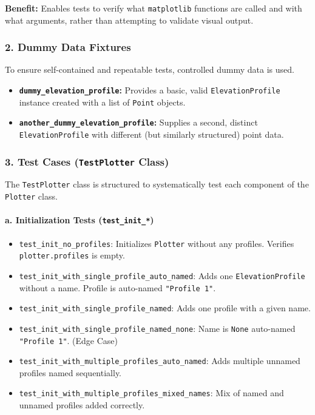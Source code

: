 \documentclass[12pt]{article}
\begin{document}
\textbf{Benefit:} Enables tests to verify what \texttt{matplotlib} functions are called and with what arguments, rather than attempting to validate visual output.

\subsubsection*{2. Dummy Data Fixtures}
To ensure self-contained and repeatable tests, controlled dummy data is used.

\begin{itemize}
  \item \textbf{\texttt{dummy\_elevation\_profile}:} Provides a basic, valid \texttt{ElevationProfile} instance created with a list of \texttt{Point} objects.
  \item \textbf{\texttt{another\_dummy\_elevation\_profile}:} Supplies a second, distinct \texttt{ElevationProfile} with different (but similarly structured) point data.
\end{itemize}

\subsubsection*{3. Test Cases (\texttt{TestPlotter} Class)}
The \texttt{TestPlotter} class is structured to systematically test each component of the \texttt{Plotter} class.

\paragraph{a. Initialization Tests (\texttt{test\_init\_*})}
\begin{itemize}
  \item \texttt{test\_init\_no\_profiles}: Initializes \texttt{Plotter} without any profiles. Verifies \texttt{plotter.profiles} is empty.
  \item \texttt{test\_init\_with\_single\_profile\_auto\_named}: Adds one \texttt{ElevationProfile} without a name. Profile is auto-named \texttt{"Profile 1"}.
  \item \texttt{test\_init\_with\_single\_profile\_named}: Adds one profile with a given name.
  \item \texttt{test\_init\_with\_single\_profile\_named\_none}: Name is \texttt{None} \textrightarrow{} auto-named \texttt{"Profile 1"}. (Edge Case)
  \item \texttt{test\_init\_with\_multiple\_profiles\_auto\_named}: Adds multiple unnamed profiles \textrightarrow{} named sequentially.
  \item \texttt{test\_init\_with\_multiple\_profiles\_mixed\_names}: Mix of named and unnamed profiles added correctly.
\end{itemize}
\end{document}
